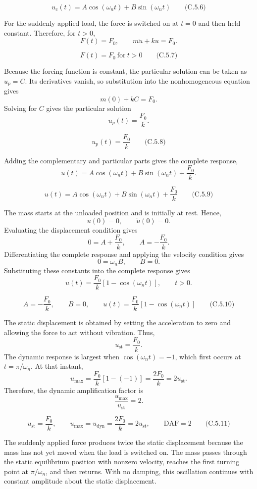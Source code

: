\[
\boxed{u_c(t)=A\cos(\omega_nt)+B\sin(\omega_nt)}
\qquad\text{(C.5.6)}
\]

For the suddenly applied load, the force is switched on at \(t=0\) and then held constant. Therefore, for \(t>0\),
\[
F(t)=F_0,
\qquad m\ddot u+ku=F_0.
\]

\[
\boxed{F(t)=F_0\ \text{for}\ t>0}
\qquad\text{(C.5.7)}
\]

Because the forcing function is constant, the particular solution can be taken as \(u_p=C\). Its derivatives vanish, so substitution into the nonhomogeneous equation gives
\[
m(0)+kC=F_0.
\]
Solving for \(C\) gives the particular solution
\[
u_p(t)=\frac{F_0}{k}.
\]

\[
\boxed{u_p(t)=\frac{F_0}{k}}
\qquad\text{(C.5.8)}
\]

Adding the complementary and particular parts gives the complete response,
\[
u(t)=A\cos(\omega_nt)+B\sin(\omega_nt)+\frac{F_0}{k}.
\]

\[
\boxed{u(t)=A\cos(\omega_nt)+B\sin(\omega_nt)+\frac{F_0}{k}}
\qquad\text{(C.5.9)}
\]

The mass starts at the unloaded position and is initially at rest. Hence,
\[
u(0)=0,\qquad \dot u(0)=0.
\]
Evaluating the displacement condition gives
\[
0=A+\frac{F_0}{k},
\qquad A=-\frac{F_0}{k}.
\]
Differentiating the complete response and applying the velocity condition gives
\[
0=\omega_nB,
\qquad B=0.
\]
Substituting these constants into the complete response gives
\[
u(t)=\frac{F_0}{k}\left[1-\cos(\omega_nt)\right],\qquad t>0.
\]

\[
\boxed{A=-\frac{F_0}{k},\qquad B=0,\qquad u(t)=\frac{F_0}{k}\left[1-\cos(\omega_nt)\right]}
\qquad\text{(C.5.10)}
\]

The static displacement is obtained by setting the acceleration to zero and allowing the force to act without vibration. Thus,
\[
u_{\mathrm{st}}=\frac{F_0}{k}.
\]
The dynamic response is largest when \(\cos(\omega_nt)=-1\), which first occurs at \(t=\pi/\omega_n\). At that instant,
\[
u_{\max}=\frac{F_0}{k}[1-(-1)]=\frac{2F_0}{k}=2u_{\mathrm{st}}.
\]
Therefore, the dynamic amplification factor is
\[
\frac{u_{\max}}{u_{\mathrm{st}}}=2.
\]

\[
\boxed{u_{\mathrm{st}}=\frac{F_0}{k},\qquad u_{\max}=u_{\mathrm{dyn}}=\frac{2F_0}{k}=2u_{\mathrm{st}},\qquad \mathrm{DAF}=2}
\qquad\text{(C.5.11)}
\]

The suddenly applied force produces twice the static displacement because the mass has not yet moved when the load is switched on. The mass passes through the static equilibrium position with nonzero velocity, reaches the first turning point at \(\pi/\omega_n\), and then returns. With no damping, this oscillation continues with constant amplitude about the static displacement.
